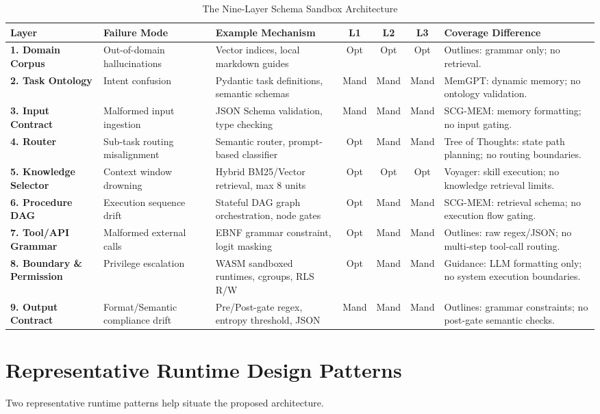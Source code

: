 \documentclass[10pt,journal,compsoc]{IEEEtran}
\begin{document}
\begin{table}[t]
\caption{The Nine-Layer Schema Sandbox Architecture}
\label{tab:layers}
\centering
\begin{tabular}{L{3.5cm}L{3cm}L{4cm}cccL{3.5cm}}
\toprule
\textbf{Layer} & \textbf{Failure Mode} & \textbf{Example Mechanism} & \textbf{L1} & \textbf{L2} & \textbf{L3} & \textbf{Coverage Difference} \\
\midrule
\textbf{1. Domain Corpus} & Out-of-domain hallucinations & Vector indices, local markdown guides & Opt & Opt & Opt & Outlines: grammar only; no retrieval. \\
\textbf{2. Task Ontology} & Intent confusion & Pydantic task definitions, semantic schemas & Mand & Mand & Mand & MemGPT: dynamic memory; no ontology validation. \\
\textbf{3. Input Contract} & Malformed input ingestion & JSON Schema validation, type checking & Mand & Mand & Mand & SCG-MEM: memory formatting; no input gating. \\
\textbf{4. Router} & Sub-task routing misalignment & Semantic router, prompt-based classifier & Opt & Mand & Mand & Tree of Thoughts: state path planning; no routing boundaries. \\
\textbf{5. Knowledge Selector} & Context window drowning & Hybrid BM25/Vector retrieval, max 8 units & Opt & Opt & Opt & Voyager: skill execution; no knowledge retrieval limits. \\
\textbf{6. Procedure DAG} & Execution sequence drift & Stateful DAG graph orchestration, node gates & Opt & Mand & Mand & SCG-MEM: retrieval schema; no execution flow gating. \\
\textbf{7. Tool/API Grammar} & Malformed external calls & EBNF grammar constraint, logit masking & Opt & Mand & Mand & Outlines: raw regex/JSON; no multi-step tool-call routing. \\
\textbf{8. Boundary \& Permission} & Privilege escalation & WASM sandboxed runtimes, cgroups, RLS R/W & Opt & Mand & Mand & Guidance: LLM formatting only; no system execution boundaries. \\
\textbf{9. Output Contract} & Format/Semantic compliance drift & Pre/Post-gate regex, entropy threshold, JSON & Mand & Mand & Mand & Outlines: grammar constraints; no post-gate semantic checks. \\
\bottomrule
\end{tabular}
\end{table}


\section{Representative Runtime Design Patterns}
Two representative runtime patterns help situate the proposed architecture.
\end{document}
